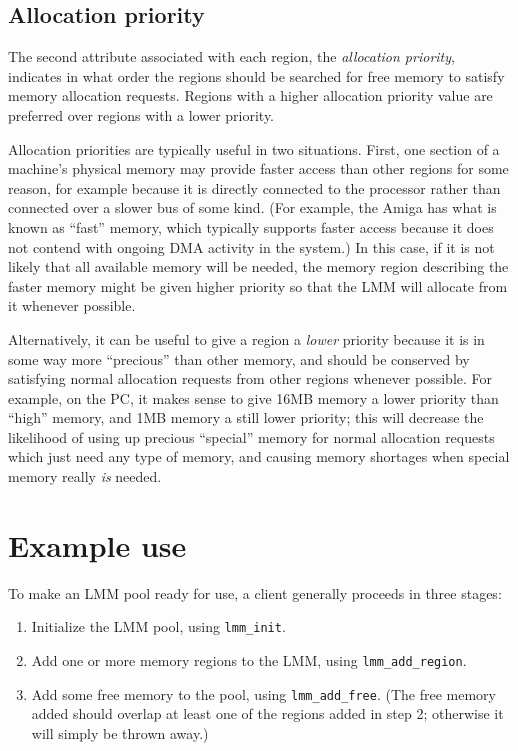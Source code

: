 \subsection{Allocation priority}

The second attribute associated with each region,
the \emph{allocation priority},
indicates in what order the regions should be searched for free memory
to satisfy memory allocation requests.
Regions with a higher allocation priority value
are preferred over regions with a lower priority.

Allocation priorities are typically useful in two situations.
First, one section of a machine's physical memory
may provide faster access than other regions for some reason,
for example because it is directly connected to the processor
rather than connected over a slower bus of some kind.
(For example, the Amiga has what is known as ``fast'' memory,
which typically supports faster access because
it does not contend with ongoing DMA activity in the system.)
In this case, if it is not likely that all available memory will be needed,
the memory region describing the faster memory might be given higher priority
so that the LMM will allocate from it whenever possible.

Alternatively, it can be useful to give a region a \emph{lower} priority
because it is in some way more ``precious'' than other memory,
and should be conserved by satisfying normal allocation requests
from other regions whenever possible.
For example, on the PC,
it makes sense to give 16MB memory a lower priority than ``high'' memory,
and 1MB memory a still lower priority;
this will decrease the likelihood of using up precious ``special'' memory
for normal allocation requests which just need any type of memory,
and causing memory shortages when special memory really \emph{is} needed.

\section{Example use}

To make an LMM pool ready for use, a client generally proceeds in three stages:
\begin{enumerate}
\item	Initialize the LMM pool, using {\tt lmm_init}.
\item	Add one or more memory regions to the LMM, using {\tt lmm_add_region}.
\item	Add some free memory to the pool, using {\tt lmm_add_free}.
	(The free memory added should overlap
	at least one of the regions added in step 2;
	otherwise it will simply be thrown away.)
\end{enumerate}


